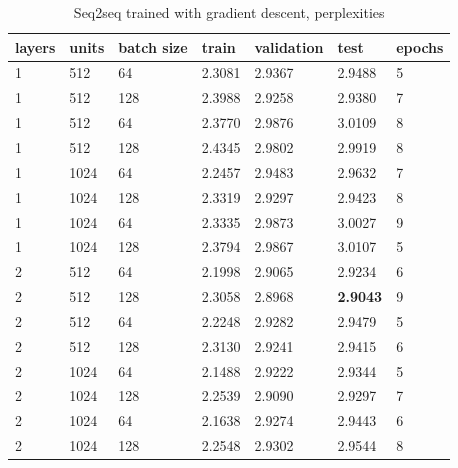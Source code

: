 \documentclass[12pt]{article}\pagestyle{myheadings}
\begin{document}
\begin{table}[]
\centering
\caption{Seq2seq trained with gradient descent, perplexities}
\label{my-label}
\begin{tabular}{|l|l|l|l|l|l|l|}
\hline
layers  & units & batch size   & train & validation & test & epochs \\ \hline
1 & 512  & 64 &   2.3081    &    2.9367        &    2.9488  &   5     \\ \hline
1 & 512  & 128 &   2.3988    &    2.9258        &    2.9380  &   7     \\ \hline
\rowcolor[HTML]{EFEFEF}
1 & 512  & 64 &   2.3770    &    2.9876        &    3.0109  &   8     \\ \hline
\rowcolor[HTML]{EFEFEF}
1 & 512  & 128 &   2.4345    &    2.9802        &    2.9919  &   8     \\ \hline
1 & 1024  & 64 &   2.2457    &    2.9483        &    2.9632  &   7     \\ \hline
1 & 1024  & 128 &   2.3319    &    2.9297        &    2.9423  &   8     \\ \hline
\rowcolor[HTML]{EFEFEF}
1 & 1024  & 64 &   2.3335    &    2.9873        &    3.0027  &   9     \\ \hline
\rowcolor[HTML]{EFEFEF}
1 & 1024  & 128 &   2.3794    &    2.9867        &    3.0107  &   5     \\ \hline
2 & 512  & 64 &   2.1998    &    2.9065        &    2.9234  &   6     \\ \hline
2 & 512  & 128 &   2.3058    &    2.8968        &    \textbf{2.9043}  &   9     \\ \hline
\rowcolor[HTML]{EFEFEF}
2 & 512  & 64 &   2.2248    &    2.9282        &    2.9479  &   5     \\ \hline
\rowcolor[HTML]{EFEFEF}
2 & 512  & 128 &   2.3130    &    2.9241        &    2.9415  &   6     \\ \hline
2 & 1024  & 64 &   2.1488    &    2.9222        &    2.9344  &   5     \\ \hline
2 & 1024  & 128 &   2.2539    &    2.9090        &    2.9297  &   7     \\ \hline
\rowcolor[HTML]{EFEFEF}
2 & 1024  & 64 &   2.1638    &    2.9274        &    2.9443  &   6     \\ \hline
\rowcolor[HTML]{EFEFEF}
2 & 1024  & 128 &   2.2548    &    2.9302        &    2.9544  &   8     \\ \hline
\end{tabular}
\end{table}
\end{document}
